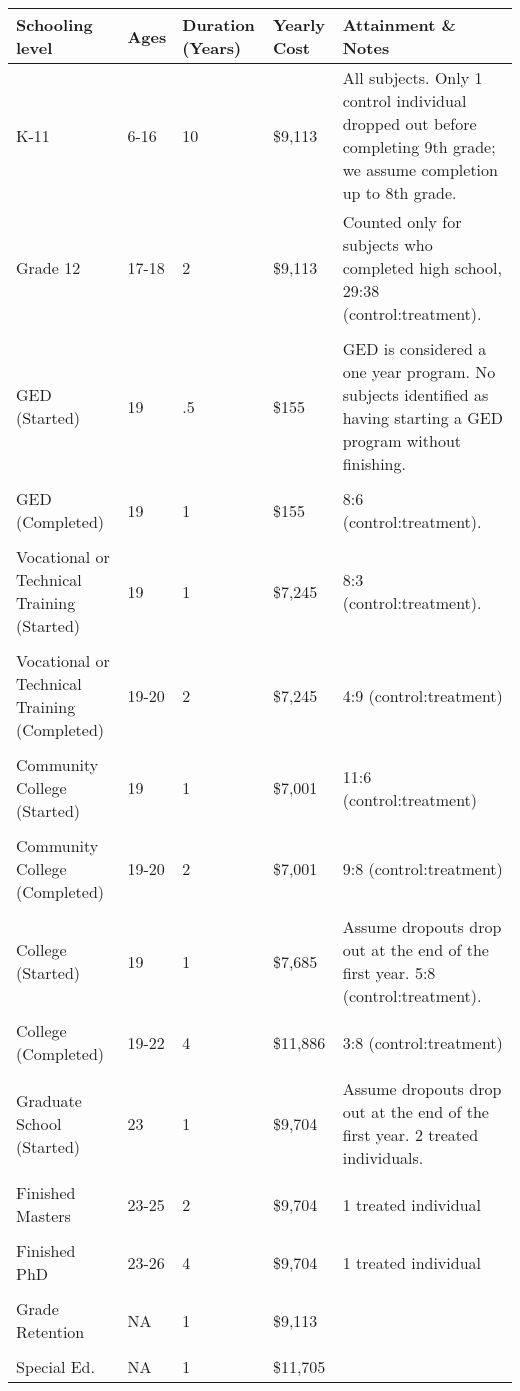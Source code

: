 \begin{tabular}{C{3.5cm} C{1.5cm} C{1.5cm} C{2cm} C{6.5cm}}
\toprule
Schooling level & Ages & Duration (Years) & Yearly Cost &Attainment \& Notes\\ \midrule
K-11 & 6-16 & 10 &   \$9,113  & All subjects. Only 1 control individual dropped out before completing 9th grade; we assume completion up to 8th grade. \\
Grade 12 & 17-18 & 2 &  \$9,113  & Counted only for subjects who completed high school, 29:38 (control:treatment).\\ \\
GED (Started) & 19 & .5 &  \$155& GED is considered a one year program. No subjects identified as having starting a GED program without finishing.\\ \\
GED (Completed) & 19 & 1 & \$155 & 8:6 (control:treatment).\\ \\
Vocational or Technical Training (Started)& 19 & 1 & \$7,245 & 8:3  (control:treatment).\\ \\
Vocational or Technical Training (Completed)& 19-20 & 2 &  \$7,245 &  4:9 (control:treatment)\\ \\
Community College (Started) &   19 & 1 &  \$7,001 & 11:6 (control:treatment) \\ \\
Community College (Completed) & 19-20 & 2 &  \$7,001 & 9:8 (control:treatment)\\ \\
 College (Started)   &  19 & 1 &  \$7,685& Assume dropouts drop out at the end of the first year. 5:8 (control:treatment).\\ \\
 College (Completed) &  19-22 & 4 & \$11,886 & 3:8 (control:treatment)\\ \\
Graduate School (Started) & 23 & 1 &  \$9,704& Assume dropouts drop out at the end of the first year. 2 treated individuals.\\ \\
 Finished Masters &  23-25 & 2 &  \$9,704& 1 treated individual\\ \\
 Finished PhD & 23-26 & 4 & \$9,704 & 1 treated individual\\ \\
 \midrule
 Grade Retention& NA & 1 &\$9,113 & \\ \\
 Special Ed.& NA & 1 &  \$11,705  & \\ 
 \bottomrule
 \end{tabular}
